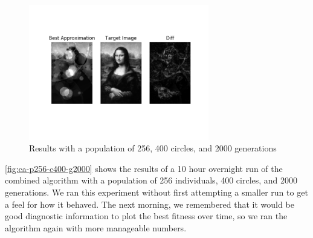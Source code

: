 \documentclass{article}
\begin{document}
\begin{figure}[H]
    \centering
    \includegraphics[width=0.7\textwidth]{output/ca-p256c400g2000.png}
    \caption{Results with a population of 256, 400 circles, and 2000
        generations}\label{fig:ca-p256-c400-g2000}
\end{figure}

\autoref{fig:ca-p256-c400-g2000} shows the results of a 10 hour overnight run of the combined
algorithm with a population of 256 individuals, 400 circles, and 2000 generations. We ran this
experiment without first attempting a smaller run to get a feel for how it behaved. The next
morning, we remembered that it would be good diagnostic information to plot the best fitness over
time, so we ran the algorithm again with more manageable numbers.
\end{document}
